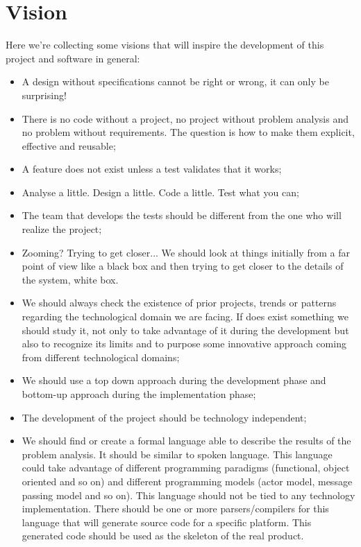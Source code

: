 \section{Vision}
Here we’re collecting some visions that will inspire the development of this project and software in general:
\begin{itemize}
	\item A design without specifications cannot be right or wrong, it can only be surprising!
	\item There is no code without a project, no project without problem analysis and no problem without requirements. The question is how to make them explicit, effective and reusable;
	\item A feature does not exist unless a test validates that it works;
	\item Analyse a little. Design a little. Code a little. Test what you can;
	\item The team that develops the tests should be different from the one who will realize the project;
	\item Zooming? Trying to get closer... We should look at things initially from a far point of view like a black box and then trying to get closer to the details of the system, white box.
	\item We should always check the existence of prior projects, trends or patterns regarding the technological domain we are facing. If does exist something we should study it, not only to take advantage of it during the development but also to recognize its limits and to purpose some innovative approach coming from different technological domains;
	\item We should use a top down approach during the development phase and bottom-up approach during the implementation phase;
	\item The development of the project should be technology independent;
	\item We should find or create a formal language able to describe the results of the problem analysis. It should be similar to spoken language. This language could take advantage of different programming paradigms (functional, object oriented and so on) and different programming models (actor model, message passing model and so on). This language should not be tied to any technology implementation. There should be one or more parsers/compilers for this language that will generate source code for a specific platform. This generated code should be used as the skeleton of the real product.
\end{itemize}